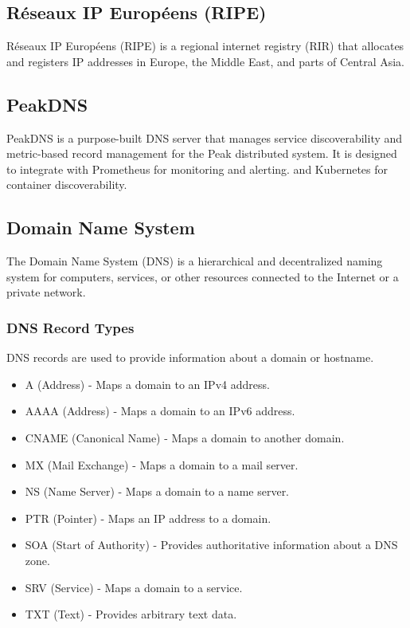 \documentclass[12pt]{article}
\begin{document}
\subsection{Réseaux IP Européens (RIPE)}
Réseaux IP Européens (RIPE)\cite{WelcomeRIPERIPE2024} is a regional internet registry (RIR) 
that allocates and registers IP addresses in Europe, the Middle East, and parts of Central Asia.

\subsection{PeakDNS}
PeakDNS\cite{heimonenPeakDNS2024} is a purpose-built DNS server that manages service discoverability and 
metric-based record management for the Peak distributed system.
It is designed to integrate with Prometheus for monitoring and alerting.
and Kubernetes for container discoverability.

\subsection{Domain Name System}
The Domain Name System (DNS)\cite{DomainNamesImplementation1987} is a hierarchical and decentralized naming system for computers, 
services, or other resources connected to the Internet or a private network.
\subsubsection{DNS Record Types}
DNS records are used to provide information about a domain or hostname.
\begin{itemize}
    \item A (Address) - Maps a domain to an IPv4 address.
    \item AAAA (Address) - Maps a domain to an IPv6 address.
    \item CNAME (Canonical Name) - Maps a domain to another domain.
    \item MX (Mail Exchange) - Maps a domain to a mail server.
    \item NS (Name Server) - Maps a domain to a name server.
    \item PTR (Pointer) - Maps an IP address to a domain.
    \item SOA (Start of Authority) - Provides authoritative information about a DNS zone.
    \item SRV (Service) - Maps a domain to a service.
    \item TXT (Text) - Provides arbitrary text data.
\end{itemize}
\end{document}
